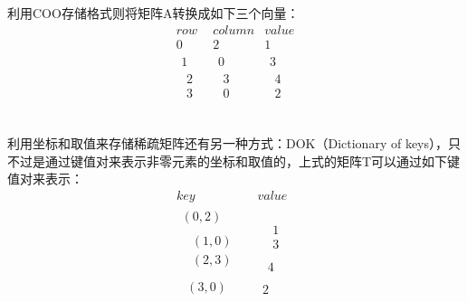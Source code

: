 利用COO存储格式则将矩阵A转换成如下三个向量：
\[\begin{matrix}
	row&		column&		value\\
	0&		2&		1\\
	\begin{array}{c}
	1\\
	\begin{array}{c}
	2\\
	3\\
\end{array}\\
\end{array}&		\begin{array}{c}
	0\\
	\begin{array}{c}
	3\\
	0\\
\end{array}\\
\end{array}&		\begin{array}{c}
	3\\
	\begin{array}{c}
	4\\
	2\\
\end{array}\\
\end{array}\\
\end{matrix}\]

利用坐标和取值来存储稀疏矩阵还有另一种方式：DOK（Dictionary of keys），只不过是通过键值对来表示非零元素的坐标和取值的，上式的矩阵T可以通过如下键值对来表示：
\[\begin{matrix}
	key&		value\\
	\begin{array}{c}
	\left( 0,2 \right)\\
	\begin{array}{c}
	\begin{array}{c}
	\left( 1,0 \right)\\
	\left( 2,3 \right)\\
\end{array}\\
	\left( 3,0 \right)\\
\end{array}\\
\end{array}&		\begin{array}{c}
	\begin{array}{c}
	\begin{array}{c}
	1\\
	3\\
\end{array}\\
	4\\
\end{array}\\
	2\\
\end{array}\\
\end{matrix}\]

